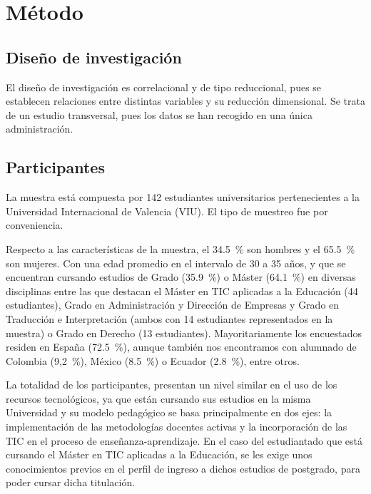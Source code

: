 \documentclass[spanish]{textolivre}
\begin{document}
\section{Método}\label{sec-metodo}
\subsection{Diseño de investigación}\label{sec-diseno}

El diseño de investigación es correlacional y de tipo reduccional, pues se establecen relaciones entre distintas variables y su reducción dimensional. Se trata de un estudio transversal, pues los datos se han recogido en una única administración.

\subsection{Participantes}\label{sec-participantes}

La muestra está compuesta por 142 estudiantes universitarios pertenecientes a la Universidad Internacional de Valencia (VIU). El tipo de muestreo fue por conveniencia.

Respecto a las características de la muestra, el 34.5~\% son hombres y el 65.5~\% son mujeres. Con una edad promedio en el intervalo de 30 a 35 años, y que se encuentran cursando estudios de Grado (35.9~\%) o Máster (64.1~\%) en diversas disciplinas entre las que destacan el Máster en TIC aplicadas a la Educación (44 estudiantes), Grado en Administración y Dirección de Empresas y Grado en Traducción e Interpretación (ambos con 14 estudiantes representados en la muestra) o Grado en Derecho (13 estudiantes). Mayoritariamente los encuestados residen en España (72.5~\%), aunque también nos encontramos con alumnado de Colombia (9,2~\%), México (8.5~\%) o Ecuador (2.8~\%), entre otros.

La totalidad de los participantes, presentan un nivel similar en el uso de los recursos tecnológicos, ya que están cursando sus estudios en la misma Universidad y su modelo pedagógico se basa principalmente en dos ejes: la implementación de las metodologías docentes activas y la incorporación de las TIC en el proceso de enseñanza-aprendizaje. En el caso del estudiantado que está cursando el Máster en TIC aplicadas a la Educación, se les exige unos conocimientos previos en el perfil de ingreso a dichos estudios de postgrado, para poder cursar dicha titulación.
\end{document}
